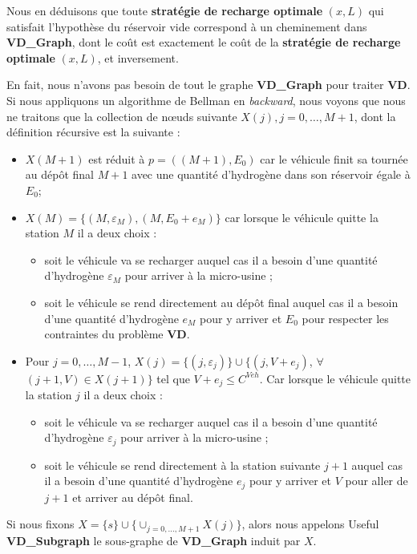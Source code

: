 Nous en déduisons que toute \textbf{stratégie de recharge optimale} $(x, L)$ qui satisfait l'hypothèse du réservoir vide correspond à un cheminement dans \textbf{VD\_Graph}, dont le coût est exactement le coût de la \textbf{stratégie de recharge optimale} $(x, L)$, et inversement.

En fait, nous n'avons pas besoin de tout le graphe \textbf{VD\_Graph} pour traiter \textbf{VD}. Si nous appliquons un algorithme de Bellman en \textit{backward}, nous voyons que nous ne traitons que la collection de nœuds suivante $X(j), j = 0,\dots, M+1$, dont la définition récursive est la suivante :
\begin{itemize}[label=$\square$]
	\item  $X(M+1)$ est réduit à $p = ((M+1), E_0)$ car le véhicule finit sa tournée au dépôt final $M+1$ avec une quantité d'hydrogène dans son réservoir égale à $E_0$;
	\item  $X(M) = \{(M, \varepsilon_M), (M, E_0 + e_M)\}$ car lorsque le véhicule quitte la station $M$ il a deux choix : 
	\begin{itemize}
		\item soit le véhicule va se recharger auquel cas il a besoin d'une quantité d'hydrogène $\varepsilon_M$ pour arriver à la micro-usine ; 
		\item soit le véhicule se rend directement au dépôt final auquel cas il a besoin d'une quantité d'hydrogène $e_M$ pour y arriver et $E_0$ pour respecter les contraintes du problème \textbf{VD}.
	\end{itemize}
	\item Pour $j = 0,\dots, M-1$, $X(j) = \{(j, \varepsilon_j)\} \cup \{(j, V+ e_j)$, $\forall$ $(j+1, V) \in X(j+1)\}$ tel que $V+ e_j \leq C^{Veh}$. Car lorsque le véhicule quitte la station $j$ il a deux choix : 
	\begin{itemize}
		\item soit le véhicule va se recharger auquel cas il a besoin d'une quantité d'hydrogène $\varepsilon_j$ pour arriver à la micro-usine ; 
		\item soit le véhicule se rend directement à la station suivante $j+1$ auquel cas il a besoin d'une quantité d'hydrogène $e_j$ pour y arriver et $V$ pour aller de $j+1$ et arriver au dépôt final.
	\end{itemize}
\end{itemize}
Si nous fixons $X = \{s\} \cup \{\cup_{ j = 0,\dots, M+1} X(j)\}$, alors nous appelons Useful \textbf{VD\_Subgraph} le sous-graphe de \textbf{VD\_Graph} induit par $X$.

